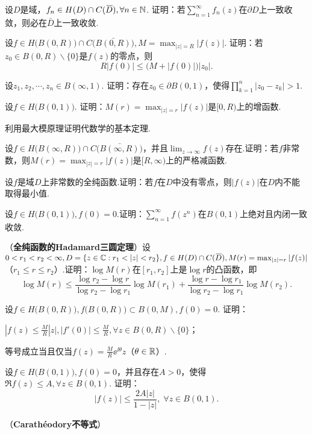\begin{xiti}
  \item 设$D$是域，$f_n\in H(D)\cap C({}\mkern2mu\overline{\mkern-2muD}),\forall n\in \mathbb N$. 证明：若$\sum_{n=1}^\infty f_n(z)$在$\partial D$上一致收敛，则必在$\bar D$上一致收敛.
  \item 设$f\in H\big(B(0,R)\big)\cap C\big(\bar{B(0,R)}\big),M=\max_{|z|=R}|f(z)|$. 证明：若$z_0\in B(0,R)\backslash\{0\}$是$f(z)$的零点，则
    \[R|f(0)|\le\big(M+|f(0)|\big)|z_0|.\]
  \item 设$z_1,z_2,\cdots,z_n\in B(\infty,1)$. 证明：存在$z_0\in \partial B(0,1)$，使得$\prod_{k=1}^n|z_0-z_k|>1$.
  \item 设$f\in H\big(B(0,1)\big)$. 证明：$M(r)=\max_{|z|=r}|f(z)|$是$[0,R)$上的增函数.
  \item 利用最大模原理证明代数学的基本定理.
  \item 设$f\in H\big(B(\infty,R)\big)\cap C\big(\bar{B(\infty,R)}\big)$，并且$\lim_{z\to\infty}f(z)$存在.证明：若$f$非常数，则$M(r)=\max_{|z|=r}|f(z)|$是$[R,\infty)$上的严格减函数.
  \item 设$f$是域$D$上非常数的全纯函数.证明：若$f$在$D$中没有零点，则$|f(z)|$在$D$内不能取得最小值.
  \item 设$f\in H\big(B(0,1)\big),f(0)=0$.证明：$\sum_{n=1}^\infty f(z^n)$在$B(0,1)$上绝对且内闭一致收敛.
  \item （\textbf{全纯函数的Hadamard三圆定理}）设$0<r_1<r_2<\infty,D=\{z\in \MC:r_1<|z|<r_2\},f\in H(D)\cap C(\bar D),M(r)=
    \max_{|z|=r}|f(z)|$（$r_1\le r\le r_2$）.证明：$\log M(r)$在$[r_1,r_2]$上是$\log r$的凸函数，即
    \[\log M(r)\le\frac{\log r_2-\log r}{\log r_2-\log r_1}\log M(r_1)
    +\frac{\log r-\log r_1}{\log r_2-\log r_1}\log M(r_2).\]
  \item 设$f\in H\big(B(0,R)\big),f\big(B(0,R)\big)\subset B(0,M),f(0)=0$. 证明：
    \begin{enuma}
      \item $|f(z)\le\frac MR|z|,|f'(0)|\le \frac MR,\forall z\in B(0,R)\backslash\{0\}$；
      \item 等号成立当且仅当$f(z)=\frac MR\ee^{\ii\theta}z$（$\theta\in\mathbb R$）.
    \end{enuma}
  \item 设$f\in H\big(B(0,1)\big),f(0)=0$，并且存在$A>0$，使得$\Re f(z)\le A,\forall z\in B(0,1)$. 证明：
      \[
        |f(z)| \le \frac{2A|z|}{1-|z|}, \; \forall z\in B(0,1).
      \]
  \item （\textbf{Carath\'eodory不等式}）

\end{xiti}
